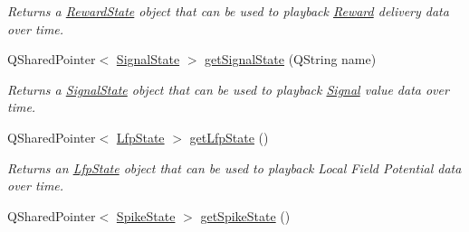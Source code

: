 \begin{DoxyCompactItemize}
\begin{DoxyCompactList}\small\item\em Returns a \hyperlink{class_picto_1_1_reward_state}{Reward\-State} object that can be used to playback \hyperlink{class_picto_1_1_reward}{Reward} delivery data over time. \end{DoxyCompactList}\item 
Q\-Shared\-Pointer$<$ \hyperlink{class_picto_1_1_signal_state}{Signal\-State} $>$ \hyperlink{class_picto_1_1_session_state_aeeb32d6162b514a58ecc8707b9d0895b}{get\-Signal\-State} (Q\-String name)
\begin{DoxyCompactList}\small\item\em Returns a \hyperlink{class_picto_1_1_signal_state}{Signal\-State} object that can be used to playback \hyperlink{class_picto_1_1_signal}{Signal} value data over time. \end{DoxyCompactList}\item 
Q\-Shared\-Pointer$<$ \hyperlink{class_picto_1_1_lfp_state}{Lfp\-State} $>$ \hyperlink{class_picto_1_1_session_state_abf27305cf07d6fb584d8f9f101946fef}{get\-Lfp\-State} ()
\begin{DoxyCompactList}\small\item\em Returns an \hyperlink{class_picto_1_1_lfp_state}{Lfp\-State} object that can be used to playback Local Field Potential data over time. \end{DoxyCompactList}\item 
\hypertarget{class_picto_1_1_session_state_ac00007c18dab104b8a23601eaae05232}{Q\-Shared\-Pointer$<$ \hyperlink{class_picto_1_1_spike_state}{Spike\-State} $>$ \hyperlink{class_picto_1_1_session_state_ac00007c18dab104b8a23601eaae05232}{get\-Spike\-State} ()}\label{class_picto_1_1_session_state_ac00007c18dab104b8a23601eaae05232}


\end{DoxyCompactItemize}
